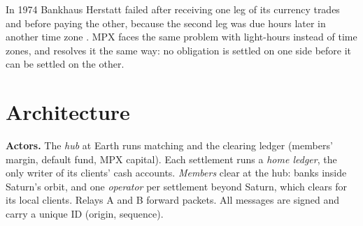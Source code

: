 \begin{abstract}
MPX clears trades for nine settlements at an Earth hub over the brief's relay backbone. Mercury through Jupiter clear every 90 minutes; Saturn, Uranus and Neptune join every fourth batch. Deadlines use the straight-line light-time, so no accepted order can use information from after its cutoff on any path. Deadline messages travel as independent copies sized from the exactly predictable loss, reaching $99.5\%$ on-time in every geometry of 200 years within the 600-origination quota. Transfers are exactly once by construction: only the destination can declare a transfer credited or never credited. Margin covers fat-tailed prices over each member's worst round trip, members hold liquidity of $30\%$ of notional, and a Cover-2 fund is prefunded at the hub. Every number is reproducible from the shipped scripts; all eight toolkit checks pass.
\end{abstract}
\vspace{-4pt}
\noindent{}
\vspace{2pt}

In 1974 Bankhaus Herstatt failed after receiving one leg of its currency trades and before paying the other, because the second leg was due hours later in another time zone \cite{bisfx}. MPX faces the same problem with light-hours instead of time zones, and resolves it the same way: no obligation is settled on one side before it can be settled on the other.
\vspace{-6pt}
\section{Architecture}\label{sec:arch}
\textbf{Actors.} The \emph{hub} at Earth runs matching and the clearing ledger (members' margin, default fund, MPX capital). Each settlement runs a \emph{home ledger}, the only writer of its clients' cash accounts. \emph{Members} clear at the hub: banks inside Saturn's orbit, and one \emph{operator} per settlement beyond Saturn, which clears for its local clients. Relays A and B forward packets. All messages are signed and carry a unique ID (origin, sequence).

